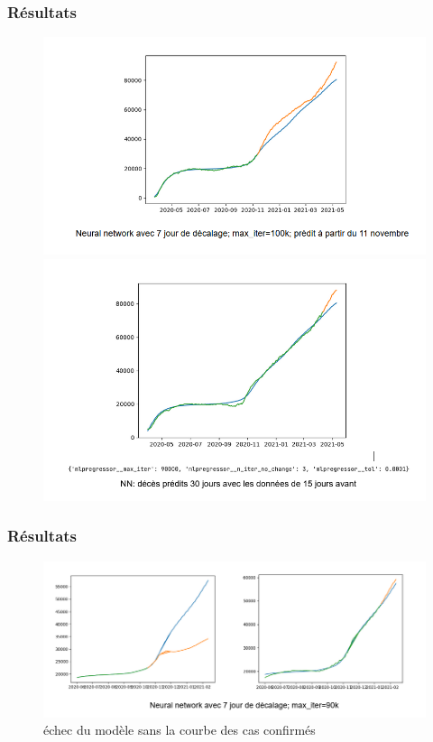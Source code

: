 \documentclass{beamer}
\begin{document}
\begin{frame}
	\frametitle{Résultats}
	\begin{figure}[h]
		\centering
		\begin{minipage}{0.5\textwidth}
			\includegraphics[scale=0.37]{NN_1}
			\centering
		\end{minipage}%
		\begin{minipage}{0.5\textwidth}
			\includegraphics[scale=0.37]{NN_2}
			\centering
		\end{minipage}
	\end{figure}
\end{frame}

\begin{frame}
	\frametitle{Résultats}
	\begin{figure}
		\includegraphics[scale=0.6]{NN_3}
		\caption{échec du modèle sans la courbe des cas confirmés}
	\end{figure}
\end{frame}

\appendix
\end{document}
